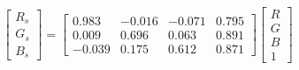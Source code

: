 \begin{equation}
\begin{bmatrix}
  R_s \\ G_s \\ B_s 
\end{bmatrix}=
\left[\begin{matrix}0.983 & -0.016 & -0.071 & 0.795\\ 
0.009 & 0.696 & 0.063 & 0.891\\ 
-0.039 & 0.175 & 0.612 & 0.871\end{matrix}\right]
\begin{bmatrix}
  R \\ G \\ B \\ 1 
\end{bmatrix}
\end{equation}
